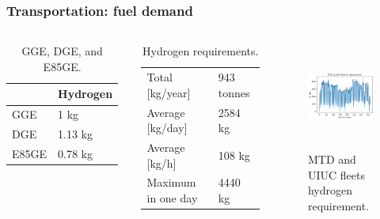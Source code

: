 \begin{frame}
\frametitle{Transportation: fuel demand}
\begin{columns}
    \column[t]{5cm}
	\begin{table}[!htb]
		\centering
	    \caption{GGE, DGE, and E85GE.}
		\begin{tabular}{l|l}
		\hline
		                 & Hydrogen \\ \hline
		GGE              & 1 kg     \\
		DGE              & 1.13 kg  \\
		E85GE            & 0.78 kg  \\ \hline
        \end{tabular}
	\end{table}

	\begin{table}[!htb]
		\centering
	    \caption{Hydrogen requirements.}
		\begin{tabular}{l|l}
		\hline
		Total [kg/year]      & 943 tonnes \\
		Average [kg/day] 	 & 2584 kg    \\
		Average [kg/h] 		 & 108 kg     \\
		Maximum in one day   & 4440 kg    \\ \hline
        \end{tabular}
	\end{table}

	\column[t]{5cm}
	\begin{figure}[htbp!]
		\begin{center}
			\includegraphics[height=3.5cm]{images/hydro-fleet}
		\end{center}
		\caption{MTD and UIUC fleets hydrogen requirement.}
	\end{figure}

\end{columns}
\end{frame}


